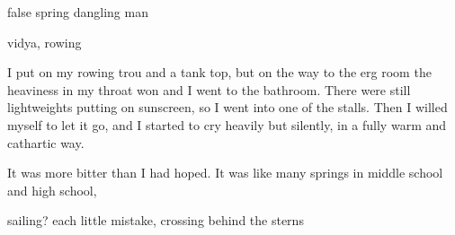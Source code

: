 false spring
dangling man




vidya, rowing

I put on my rowing trou and a tank top, but on the way to the erg room the
heaviness in my throat won and I went to the bathroom.  There were still
lightweights putting on sunscreen, so I went into one of the stalls.  Then I
willed myself to let it go, and I started to cry heavily but silently, in a
fully warm and cathartic way.  

It was more bitter than I had hoped.  It was like many springs in middle school
and high school, 

sailing?  each little mistake, crossing behind the sterns
